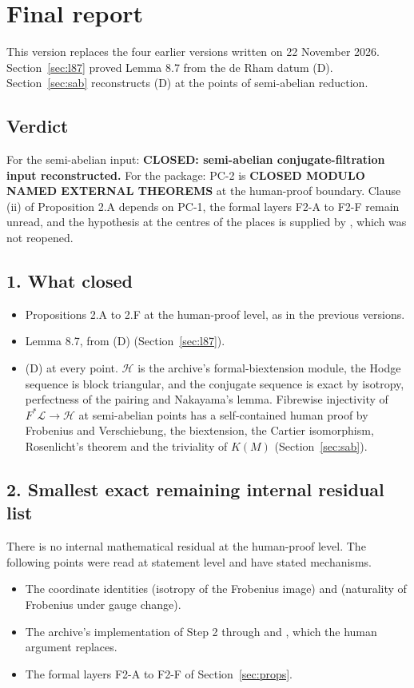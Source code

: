 \documentclass[11pt]{article}
\theoremstyle{remark}
\begin{document}
\section{Final report}\label{sec:final}

This version replaces the four earlier versions written on 22 November 2026. Section~\ref{sec:l87} proved Lemma 8.7 from the de Rham datum (D). Section~\ref{sec:sab} reconstructs (D) at the points of semi-abelian reduction.

\subsection*{Verdict}

For the semi-abelian input: \textbf{CLOSED: semi-abelian conjugate-filtration input reconstructed.} For the package: PC-2 is \textbf{CLOSED MODULO NAMED EXTERNAL THEOREMS} at the human-proof boundary. Clause (ii) of Proposition 2.A depends on PC-1, the formal layers F2-A to F2-F remain unread, and the hypothesis  at the centres of the places is supplied by , which was not reopened.

\subsection*{1. What closed}
\begin{itemize}[nosep]
\item Propositions 2.A to 2.F at the human-proof level, as in the previous versions.
\item Lemma 8.7, from (D) (Section~\ref{sec:l87}).
\item (D) at every point. $\mathcal H$ is the archive's formal-biextension module, the Hodge sequence is block triangular, and the conjugate sequence is exact by isotropy, perfectness of the pairing and Nakayama's lemma. Fibrewise injectivity of $F^*\mathcal L\to\mathcal H$ at semi-abelian points has a self-contained human proof by Frobenius and Verschiebung, the biextension, the Cartier isomorphism, Rosenlicht's theorem and the triviality of $K(M)$ (Section~\ref{sec:sab}).
\end{itemize}

\subsection*{2. Smallest exact remaining internal residual list}

There is no internal mathematical residual at the human-proof level. The following points were read at statement level and have stated mechanisms.
\begin{itemize}[nosep]
\item The coordinate identities  (isotropy of the Frobenius image) and  (naturality of Frobenius under gauge change).
\item The archive's implementation of Step 2 through  and , which the human argument replaces.
\item The formal layers F2-A to F2-F of Section~\ref{sec:props}.
\end{itemize}
\end{document}

